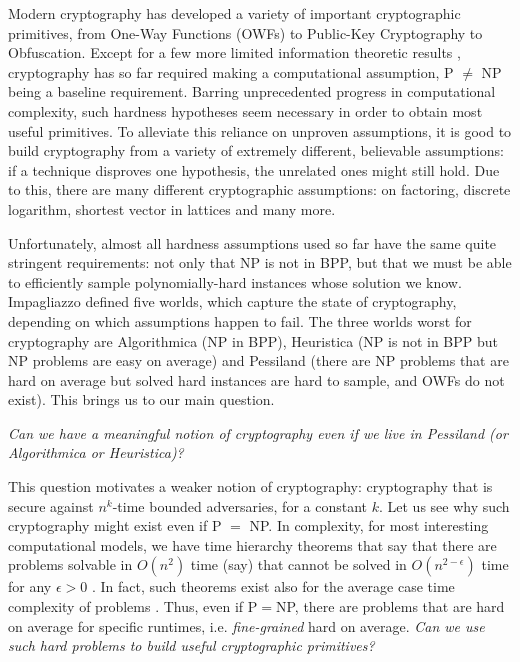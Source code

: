 
Modern cryptography has developed a variety of important cryptographic primitives, from One-Way Functions (OWFs) to Public-Key Cryptography to Obfuscation. 
Except for a few more limited information theoretic results \cite{Shamir79,CKGS98,RW02}, cryptography has so far required making a computational assumption, P $\neq$ NP being a baseline requirement.
Barring unprecedented progress in computational complexity, such hardness hypotheses seem necessary in order to obtain most useful primitives. 
To alleviate this reliance on unproven assumptions, it is good to build cryptography from a variety of extremely different, believable assumptions: if a technique disproves one hypothesis, the unrelated ones might still hold. Due to this, there are many different cryptographic assumptions: on factoring, discrete logarithm, shortest vector in lattices and many more.




Unfortunately, almost all hardness assumptions used so far have the same quite stringent requirements: not only that NP is not in BPP, but that we must be able to efficiently sample polynomially-hard instances whose solution we know. Impagliazzo \cite{Impagliazzo5worlds,RR94} defined five worlds, which capture the state of cryptography, depending on which assumptions happen to fail. The three worlds worst for cryptography are Algorithmica (NP in BPP), Heuristica (NP is not in BPP but NP problems are easy on average) and Pessiland (there are NP problems that are hard on average but solved hard instances are hard to sample, and OWFs do not exist). 
This brings us to our main question.

\begin{center}
 \emph{	Can we have a meaningful notion of cryptography even if we live in Pessiland (or Algorithmica or Heuristica)?}
\end{center}

This question motivates a weaker notion of cryptography: cryptography that is secure against $n^k$-time bounded adversaries, for a constant $k$. Let us see why such cryptography might exist even if P $=$ NP. In complexity, for most interesting computational models, we have time hierarchy theorems that say that there are problems solvable in $O(n^2)$ time (say) that cannot be solved in $O(n^{2-\epsilon})$ time for any $\epsilon>0$ \cite{HS65,HS66,Tse56}. In fact, such theorems exist also for the average case time complexity of problems \cite{Lev73}. Thus, even if P$=$NP, there are problems that are hard on average for specific runtimes, i.e. {\em fine-grained} hard on average. {\em Can we use such hard problems to build useful cryptographic primitives?} 

